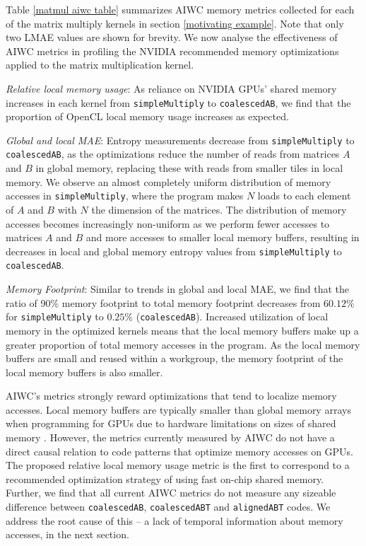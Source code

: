 \documentclass[review=false, sigchi]{acmart}
\begin{document}
	Table \ref{matmul aiwc table} summarizes AIWC memory metrics collected for each of the matrix multiply kernels in section \ref{motivating example}. Note that only two LMAE values are shown for brevity. We now analyse the effectiveness of AIWC metrics in profiling the NVIDIA recommended memory optimizations applied to the matrix multiplication kernel.
	
	\textit{Relative local memory usage}: As reliance on NVIDIA GPUs' shared memory increases in each kernel from \texttt{simpleMultiply} to \texttt{coalescedAB}, we find that the proportion of OpenCL local memory usage increases as expected.
	
	\textit{Global and local MAE}: Entropy measurements decrease from \texttt{simpleMultiply} to \texttt{coalescedAB}, as the optimizations reduce the number of reads from matrices $A$ and $B$ in global memory, replacing these with reads from smaller tiles in local memory.
	We observe an almost completely uniform distribution of memory accesses in \texttt{simpleMultiply}, where the program makes $N$ loads to each element of $A$ and $B$ with $N$ the dimension of the matrices.
	The distribution of memory accesses becomes increasingly non-uniform as we perform fewer accesses to matrices $A$ and $B$ and more accesses to smaller local memory buffers, resulting in decreases in local and global memory entropy values from \texttt{simpleMultiply} to \texttt{coalescedAB}.
	
	\textit{Memory Footprint}: Similar to trends in global and local MAE, we find that the ratio of 90\% memory footprint to total memory footprint decreases from $60.12\%$ for \texttt{simpleMultiply} to $0.25\%$ (\texttt{coalescedAB}). Increased utilization of local memory in the optimized kernels means that the local memory buffers make up a greater proportion of total memory accesses in the program. As the local memory buffers are small and reused within a workgroup, the memory footprint of the local memory buffers is also smaller. 
	
	AIWC's metrics strongly reward optimizations that tend to localize memory accesses. Local memory buffers are typically smaller than global memory arrays when programming for GPUs due to hardware limitations on sizes of shared memory \cite{cudamanual}. However, the metrics currently measured by AIWC do not have a direct causal relation to code patterns that optimize memory accesses on GPUs. The proposed relative local memory usage metric is the first to correspond to a recommended optimization strategy of using fast on-chip shared memory. Further, we find that all current AIWC metrics do not measure any sizeable difference between \texttt{coalescedAB}, \texttt{coalescedABT} and \texttt{alignedABT} codes. We address the root cause of this -- a lack of temporal information about memory accesses, in the next section.%
	
\end{document}
